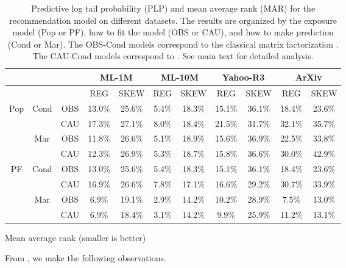 \begin{table}
\begin{subtable}[t]{\textwidth}
\begin{tabular}{ c  c  c  c c  c c  c c  c c  }
  \toprule
  \multicolumn{3}{c}{} & \multicolumn{2}{c}{\textbf{ML-1M}} & \multicolumn{2}{c}{\textbf{ML-10M}} & \multicolumn{2}{c}{\textbf{Yahoo-R3}} & \multicolumn{2}{c}{\textbf{ArXiv}} \\ \midrule
  \multicolumn{2}{c}{} & & REG & SKEW & REG & SKEW  & REG & SKEW & REG & SKEW  \\ \midrule
  \multirow{4}{*}{Pop} & \multirow{2}{*}{Cond} & OBS & 13.0\% & 25.6\% &
  5.4\% & 18.3\% & 15.1\% & 36.1\% & 18.4\% & 23.6\% \\ 
  & & CAU & 17.3\% & 27.1\% & 8.0\% & 18.4\% & 21.5\% & 31.7\% & 32.1\% & 35.7\% \\ \cmidrule{2-11}
  & \multirow{2}{*}{Mar} & OBS & 11.8\% & 26.6\% & 5.1\% & 18.9\% & 15.6\% & 36.9\% & 22.5\% & 33.8\%\\
  & & CAU & 12.3\% & 26.9\% & 5.3\% & 18.7\% & 15.8\% & 36.6\% & 30.0\%  & 42.9\% \\ \midrule
  \multirow{4}{*}{PF} & \multirow{2}{*}{Cond} & OBS & 13.0\% & 25.6\% &
  5.4\% & 18.3\% & 15.1\% & 36.1\% & 18.4\% & 23.6\% \\
  & & CAU & 16.9\% & 26.6\% & 7.8\% & 17.1\% & 16.6\% & 29.2\% & 30.7\% & 33.9\%\\ \cmidrule{2-11}
  & \multirow{2}{*}{Mar} & OBS & 6.9\% & 19.1\% & 2.9\% & 14.2\% & 10.2\% & 28.9\% & 7.5\% & 13.0\%\\
  & & CAU & 6.9\% & 18.4\% & 3.1\% & 14.2\% & 9.9\% & 25.9\% & 11.2\% & 13.1\% \\ \bottomrule
\end{tabular}
\caption{Mean average rank (smaller is better)}
\label{tab:eval_mar}
\end{subtable}
\caption{Predictive log tail probability (PLP) and mean average rank (MAR) for the recommendation model on different datasets. The results are organized by the exposure model (Pop or PF), how to fit the model (OBS or CAU), and how to make prediction (Cond or Mar). The OBS-Cond models correspond to the classical matrix factorization \citep{salakhutdinov2008probabilistic}. The CAU-Cond models correspond to \citet{schnabel16treatment}. See main text for detailed analysis. }
\label{tab:results}
\end{table}

From , we make the following observations.

